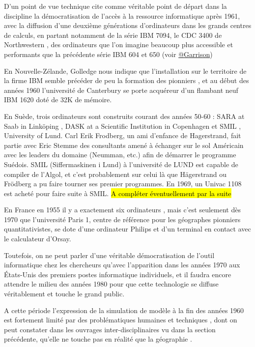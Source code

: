 D'un point de vue technique \textcite{Haggett1969} cite comme véritable point de départ dans la discipline la  démocratisation de l'accès à la ressource informatique après 1961, avec la diffusion d'une deuxième générations d'ordinateurs dans les grands centres de calculs, en partant notamment de la série IBM 7094, le CDC 3400 de Northwestern \autocite[3]{Marble1967}, des ordinateurs que l'on imagine beaucoup plus accessible et performants que la précédente série IBM 604 et 650 (voir \href{http://www.aag.org/cs/garrison}{@Garrison})

En Nouvelle-Zélande, Golledge nous indique que l'installation sur le territoire de la firme IBM semble précéder de peu la formation des pionniers \autocite[94]{Bailly2000}, et au début des années 1960 l'université de Canterbury se porte acquéreur d'un flambant neuf IBM 1620 doté de 32K de mémoire.

En Suède, trois ordinateurs sont construits courant des années 50-60 :  SARA at Saab in Linköping , DASK at a Scientific Institution in Copenhagen et SMIL , University of Lund. \autocite{Persson} Carl Erik Frodberg, un ami d'enfance de Hagerstrand, fait partie avec Eric Stemme des consultants amené à échanger sur le sol Américain avec les leaders du domaine (Neumman, etc.) afin de démarrer le programme Suédois. SMIL (Siffermaskinen i Lund) à l'université de LUND est capable de compiler de l'Algol, et c'est probablement sur celui là que Hägerstrand ou Frödberg a pu faire tourner ses premier programmes. En 1969, un Univac 1108 est acheté pour faire suite à SMIL. \hl{A compléter éventuellement par la suite}

En France en 1955 il y a exactement six ordinateurs \autocite[3]{Armatte2008}, mais c'est seulement dès 1970 que l'université Paris 1, centre de référence pour les géographes pionniers quantitativistes, se dote d'une ordinateur Philips et d'un terminal en contact avec le calculateur d'Orsay.

Toutefois, on ne peut parler d'une véritable démocratisation de l'outil informatique chez les chercheurs qu'avec l'apparition dans les années 1970 aux États-Unis des premiers postes informatique individuels, et il faudra encore attendre le milieu des années 1980 pour que cette technologie se diffuse véritablement et touche le grand public.

A cette période l'expression de la simulation de modèle à la fin des années 1960 est fortement limité par des problématiques humaines et techniques \autocite{Haggett1969} \autocite[387]{Marble1972}, dont on peut constater dans les ouvrages inter-disciplinaires vu dans la section précédente, qu'elle ne touche pas en réalité que la géographie \autocite{Guetzkow1972}.

